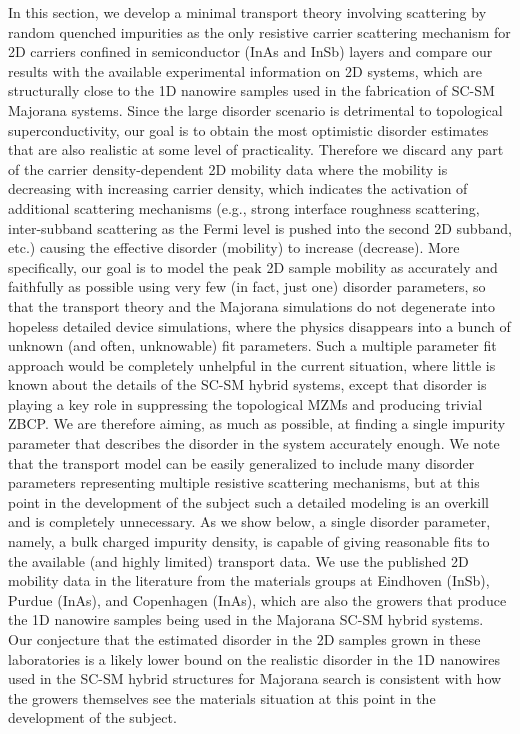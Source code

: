 \documentclass[aps,prmaterials,twocolumn,superscriptaddress,longbibliography]{revtex4-2}
\begin{document}
In this section, we develop a minimal transport theory involving scattering by random quenched impurities as the only resistive carrier scattering mechanism for 2D carriers confined in semiconductor (InAs and InSb) layers and compare our results with the available experimental information on 2D systems,
 which are structurally close to the 1D nanowire samples used in the fabrication of  SC-SM Majorana systems.  Since the large disorder scenario is detrimental to topological superconductivity, our goal is to obtain the most optimistic disorder estimates that are also realistic at some level of practicality. Therefore we discard any part of the carrier density-dependent 2D mobility data where the mobility is decreasing with increasing carrier density, which indicates the activation of additional scattering mechanisms (e.g., strong interface roughness scattering, inter-subband scattering as the Fermi level is pushed into the second 2D subband, etc.) causing the effective disorder (mobility) to increase (decrease).  
 More specifically, our goal is to model the peak 2D sample mobility as accurately and faithfully as possible using very few (in fact, just one) disorder parameters, so that the transport theory and the Majorana simulations do not degenerate into hopeless detailed device simulations, where the physics disappears into a bunch of unknown (and often, unknowable) fit parameters.  
 Such a multiple parameter fit approach would be completely unhelpful in the current situation, where little is known about the details of the SC-SM hybrid systems, except that disorder is playing a key role in suppressing the topological MZMs and producing trivial ZBCP.  We are therefore aiming, as much as possible, at finding a single impurity parameter that describes the disorder in the system accurately enough.  We note that the transport model can be easily generalized to include many disorder parameters representing multiple resistive scattering mechanisms, but at this point in the development of the subject such a detailed modeling is an overkill and is completely unnecessary.  As we show below, a single disorder parameter, namely, a bulk charged impurity density, is capable of giving reasonable fits to the available (and highly limited) transport data.  We use the published 2D mobility data in the literature from the materials groups at Eindhoven (InSb), Purdue (InAs), and Copenhagen (InAs), which are also the growers that produce the 1D nanowire samples being used in the Majorana SC-SM hybrid systems. Our conjecture that the estimated disorder in the 2D samples grown in these laboratories is a likely lower bound on the realistic disorder in the 1D nanowires used in the SC-SM hybrid structures for Majorana search is consistent with how the growers themselves see the materials situation at this point in the development of the subject.
\end{document}
